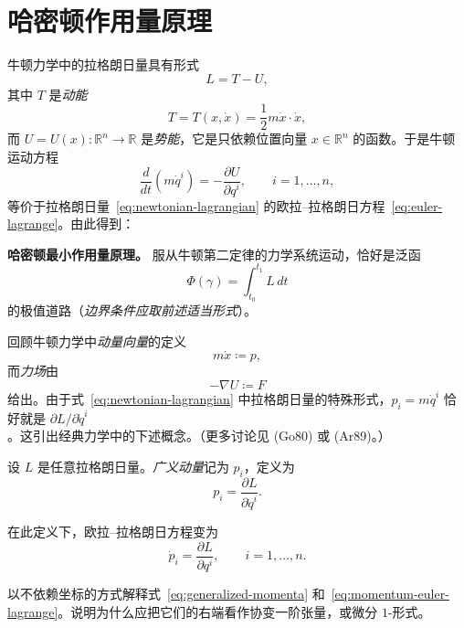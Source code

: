 \section{哈密顿作用量原理}
\label{sec:hamilton-action-principle}

牛顿力学中的拉格朗日量具有形式
\begin{equation}\label{eq:newtonian-lagrangian}
  L=T-U,
\end{equation}
其中 $T$ 是\emph{动能}
\[
  T=T(x,\dot x)=\frac12m\dot x\cdot\dot x,
\]
而 $U=U(x):\mathbb R^n\to\mathbb R$ 是\emph{势能}，它是只依赖位置向量 $x\in\mathbb R^n$ 的函数。于是牛顿运动方程
\begin{equation}\label{eq:newton-motion}
  \frac d{dt}(m\dot q^i)=-\frac{\partial U}{\partial q^i},
  \qquad i=1,\ldots,n,
\end{equation}
等价于拉格朗日量~\eqref{eq:newtonian-lagrangian} 的欧拉--拉格朗日方程~\eqref{eq:euler-lagrange}。由此得到：

\medskip
\noindent\textbf{哈密顿最小作用量原理。}
服从牛顿第二定律的力学系统运动，恰好是泛函
\[
  \Phi(\gamma)=\int_{t_0}^{t_1}L\,dt
\]
的极值道路（\emph{边界条件应取前述适当形式}）。

回顾牛顿力学中\emph{动量向量}的定义
\begin{equation}\label{eq:newtonian-momentum}
  m\dot x\coloneqq p,
\end{equation}
而\emph{力场}由
\[
  -\nabla U\coloneqq F
\]
给出。由于式~\eqref{eq:newtonian-lagrangian} 中拉格朗日量的特殊形式，$p_i=m\dot q^i$ 恰好就是 $\partial L/\partial\dot q^i$。这引出经典力学中的下述概念。（更多讨论见 (Go80) 或 (Ar89)。）

\begin{definition}
\label{def:generalized-momenta}
设 $L$ 是任意拉格朗日量。\emph{广义动量}记为 $p_i$，定义为
\begin{equation}\label{eq:generalized-momenta}
  p_i=\frac{\partial L}{\partial\dot q^i}.
\end{equation}
\end{definition}

在此定义下，欧拉--拉格朗日方程变为
\begin{equation}\label{eq:momentum-euler-lagrange}
  \dot p_i=\frac{\partial L}{\partial q^i},
  \qquad i=1,\ldots,n.
\end{equation}

\begin{exercise}
\label{ex:generalized-momenta-invariant}
以不依赖坐标的方式解释式~\eqref{eq:generalized-momenta} 和~\eqref{eq:momentum-euler-lagrange}。说明为什么应把它们的右端看作协变一阶张量，或微分 $1$-形式。
\end{exercise}

